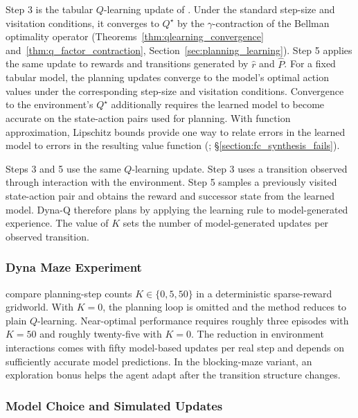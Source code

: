 Step 3 is the tabular $Q$-learning update of \citet{WatkinsDayan1992}. Under the standard step-size and visitation conditions, it converges to $Q^\star$ by the $\gamma$-contraction of the Bellman optimality operator (Theorems~\ref{thm:qlearning_convergence} and~\ref{thm:q_factor_contraction}, Section~\ref{sec:planning_learning}). Step 5 applies the same update to rewards and transitions generated by $\widehat r$ and $\widehat P$. For a fixed tabular model, the planning updates converge to the model's optimal action values under the corresponding step-size and visitation conditions. Convergence to the environment's $Q^\star$ additionally requires the learned model to become accurate on the state-action pairs used for planning. With function approximation, Lipschitz bounds provide one way to relate errors in the learned model to errors in the resulting value function (\citealt{Asadi2018Lipschitz}; \S\ref{section:fc_synthesis_fails}).

Steps 3 and 5 use the same $Q$-learning update. Step 3 uses a transition observed through interaction with the environment. Step 5 samples a previously visited state-action pair and obtains the reward and successor state from the learned model. Dyna-Q therefore plans by applying the learning rule to model-generated experience. The value of $K$ sets the number of model-generated updates per observed transition.

\subsubsection{Dyna Maze Experiment}
\label{section:fc_dyna_q_empirics}

\citet{sutton2018} compare planning-step counts $K \in \{0, 5, 50\}$ in a deterministic sparse-reward gridworld. With $K = 0$, the planning loop is omitted and the method reduces to plain $Q$-learning. Near-optimal performance requires roughly three episodes with $K = 50$ and roughly twenty-five with $K = 0$. The reduction in environment interactions comes with fifty model-based updates per real step and depends on sufficiently accurate model predictions. In the blocking-maze variant, an exploration bonus helps the agent adapt after the transition structure changes.

\subsubsection{Model Choice and Simulated Updates}
\label{section:fc_dyna_q_architecture}

